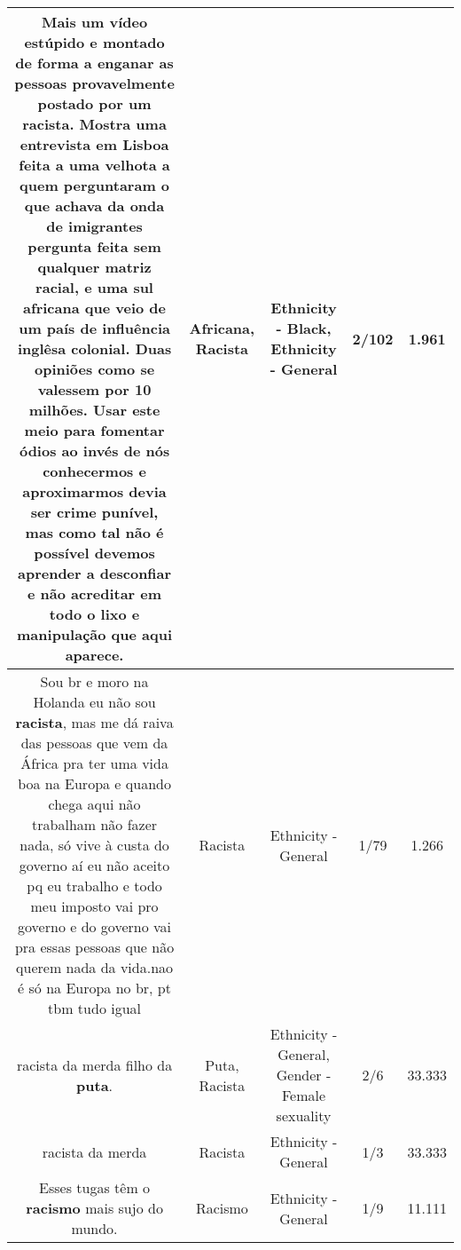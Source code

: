 \documentclass[11pt]{article}
\newlength\mylength
\begin{document}
\begin{center}
\begin{longtable}{|C{.65\mylength}|C{.30\mylength}|C{.12\mylength}|C{.12\mylength}|C{.12\mylength}|}
  \small Mais um vídeo estúpido e montado de forma a enganar as pessoas provavelmente postado por um \textbf{racista}. Mostra uma entrevista em Lisboa feita a uma velhota a quem perguntaram o que achava da onda de imigrantes pergunta feita sem qualquer matriz racial, e uma sul \textbf{africana} que veio de um país de influência inglêsa colonial. Duas opiniões como se valessem por 10 milhões. Usar este meio para fomentar ódios ao invés de nós conhecermos e aproximarmos devia ser crime punível, mas como tal não é possível devemos aprender a desconfiar e não acreditar em todo o lixo e manipulação que aqui  aparece.\normalsize   & Africana, Racista & Ethnicity - Black, Ethnicity - General & 2/102 & 1.961 \\  \hline
  \small Sou br e moro na Holanda eu não sou \textbf{racista}, mas me dá raiva das pessoas que vem da África pra ter uma vida boa na Europa e quando chega aqui não trabalham não fazer nada, só vive à custa do governo aí eu não aceito pq eu trabalho e todo meu imposto vai pro governo e do governo vai pra essas pessoas que não querem nada da vida.nao é só na Europa no br, pt  tbm tudo igual\normalsize   & Racista & Ethnicity - General & 1/79 & 1.266 \\  \hline
  \small racista da merda filho da \textbf{puta}.\normalsize   & Puta, Racista & Ethnicity - General, Gender - Female sexuality & 2/6 & 33.333 \\  \hline
  \small racista da merda\normalsize   & Racista & Ethnicity - General & 1/3 & 33.333 \\  \hline
  \small Esses tugas têm o \textbf{racismo} mais sujo do mundo.\normalsize   & Racismo & Ethnicity - General & 1/9 & 11.111 \\  \hline

\end{longtable}
\end{center}
\end{document}
